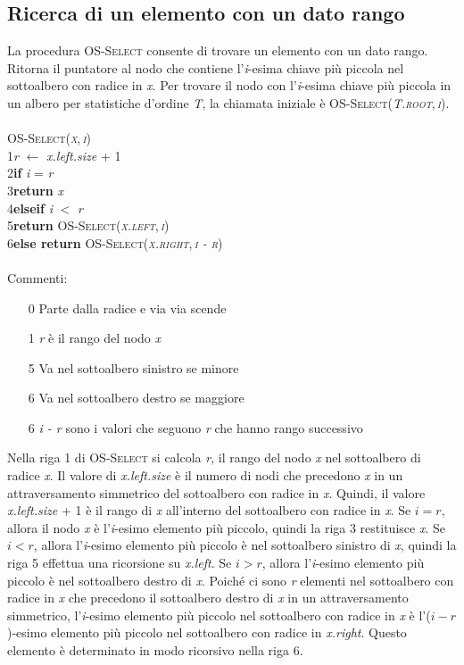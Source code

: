 \documentclass[10pt, a4paper]{report}
\newcommand\firsttab[1][0.5cm]{\hspace*{#1}}
\newcommand\secondtab[1][1cm]{\hspace*{#1}}
\begin{document}
\subsection{Ricerca di un elemento con un dato rango}
La procedura \textsc{OS-Select} consente di trovare un elemento con un dato rango. Ritorna il puntatore al nodo che contiene l'\textit{i}-esima chiave più piccola nel sottoalbero con radice in \textit{x}. Per trovare il nodo con l'\textit{i}-esima chiave più piccola in un albero per statistiche d'ordine \textit{T}, la chiamata iniziale è \textsc{OS-Select(\textit{T.root},\,\textit{i})}.\\\\
\textsc{OS-Select(\textit{x},\,\textit{i})}\\
1\firsttab\textit{r} $\leftarrow$ \textit{x.left.size} + 1\\
2\firsttab\textbf{if} \textit{i} = \textit{r}\\
3\secondtab\textbf{return} \textit{x}\\
4\firsttab\textbf{elseif} \textit{i} $<$ \textit{r}\\
5\secondtab\textbf{return} \textsc{OS-Select(\textit{x.left},\,\textit{i})}\\
6\firsttab\textbf{else return} \textsc{OS-Select(\textit{x.right},\,\textit{i - r})}\\\\
Commenti:
\begin{enumerate}
\item[0]Parte dalla radice e via via scende
\item[1]\textit{r} è il rango del nodo \textit{x}
\item[5]Va nel sottoalbero sinistro se minore
\item[6]Va nel sottoalbero destro se maggiore
\item[6]\textit{i - r} sono i valori che seguono \textit{r} che hanno rango successivo
\end{enumerate}
Nella riga 1  di \textsc{OS-Select} si calcola \textit{r}, il rango del nodo \textit{x} nel sottoalbero di radice \textit{x}. Il valore di \textit{x.left.size} è il numero di nodi che precedono \textit{x} in un attraversamento simmetrico del sottoalbero con radice in \textit{x}. Quindi, il valore \textit{x.left.size} + 1 è il rango di \textit{x} all'interno del sottoalbero con radice in \textit{x}. Se $i = r$, allora il nodo \textit{x} è l'\textit{i}-esimo elemento più piccolo, quindi la riga 3 restituisce \textit{x}. Se $i < r$, allora l'\textit{i}-esimo elemento più piccolo è nel sottoalbero sinistro di \textit{x}, quindi la riga 5 effettua una ricorsione su \textit{x.left}. Se $i > r$, allora l'\textit{i}-esimo elemento più piccolo è nel sottoalbero destro di \textit{x}. Poiché ci sono \textit{r} elementi nel sottoalbero con radice in \textit{x} che precedono il sottoalbero destro di \textit{x} in un attraversamento simmetrico, l'\textit{i}-esimo elemento più piccolo nel sottoalbero con radice in \textit{x} è l'($i - r$)-esimo elemento più piccolo nel sottoalbero con radice in \textit{x.right}. Questo elemento è determinato in modo ricorsivo nella riga 6.
\end{document}
